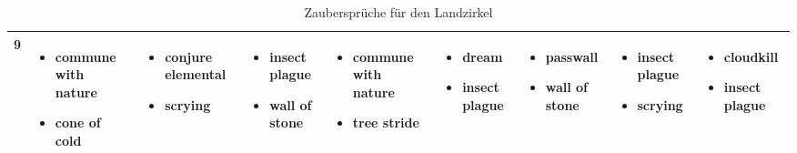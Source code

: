 \begin{table}
\begin{tabular}{cp{3cm}p{3cm}p{3cm}p{3cm}p{3cm}p{3cm}p{3cm}p{3cm}}
	9 & 
	\begin{itemize}
		\item commune with nature
		\item cone of cold
	\end{itemize}&
	\begin{itemize}
		\item conjure elemental
		\item scrying
	\end{itemize}& 
	\begin{itemize}
		\item insect plague
		\item wall of stone
	\end{itemize}&
	\begin{itemize}
		\item commune with nature
		\item tree stride
	\end{itemize}&
	\begin{itemize}
		\item dream
		\item insect plague
	\end{itemize}&
	\begin{itemize}
		\item passwall
		\item wall of stone
	\end{itemize}&
	\begin{itemize}
		\item insect plague
		\item scrying
	\end{itemize}&
	\begin{itemize}
		\item cloudkill
		\item insect plague
	\end{itemize}\\ \hline		
	\end{tabular}
	\caption{Zaubersprüche für den Landzirkel}
\end{table}